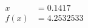 \documentclass[preview]{standalone}
\begin{document}
\begin{align*}
x &= 0.1417\\f(x) &= 4.2532533
\end{align*}
\end{document}
